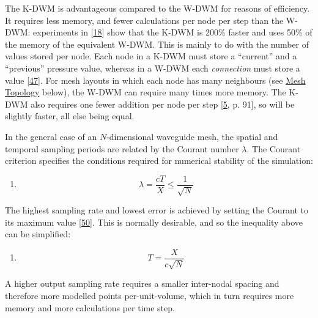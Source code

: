 \documentclass[]{scrreprt}
\providecommand{\tightlist}{%
  \setlength{\itemsep}{0pt}\setlength{\parskip}{0pt}}
\begin{document}
The K-DWM is advantageous compared to the W-DWM for reasons of
efficiency. It requires less memory, and fewer calculations per node per
step than the W-DWM: experiments in
{[}\protect\hyperlink{ref-beesonux5froomweaver:ux5f2004}{18}{]} show
that the K-DWM is 200\% faster and uses 50\% of the memory of the
equivalent W-DWM. This is mainly to do with the number of values stored
per node. Each node in a K-DWM must store a ``current'' and a
``previous'' pressure value, whereas in a W-DWM each \emph{connection}
must store a value
{[}\protect\hyperlink{ref-karjalainenux5fdigitalux5f2004}{47}{]}. For
mesh layouts in which each node has many neighbours (see
\protect\hyperlink{mesh-topology}{Mesh Topology} below), the W-DWM can
require many times more memory. The K-DWM also requires one fewer
addition per node per step
{[}\protect\hyperlink{ref-shelleyux5fdiffuseux5f2007}{5}, p. 91{]}, so
will be slightly faster, all else being equal.

In the general case of an \(N\)-dimensional waveguide mesh, the spatial
and temporal sampling periods are related by the Courant number
\(\lambda\). The Courant criterion specifies the conditions required for
numerical stability of the simulation:

\begin{enumerate}
\def\labelenumi{(\arabic{enumi})}
\setcounter{enumi}{21}
\tightlist
\item
  \[\lambda=\frac{cT}{X} \leq \frac{1}{\sqrt{N}}\]
\end{enumerate}

The highest sampling rate and lowest error is achieved by setting the
Courant to its maximum value
{[}\protect\hyperlink{ref-sheafferux5ffdtdux2fk-dwmux5f2010}{50}{]}.
This is normally desirable, and so the inequality above can be
simplified:

\begin{enumerate}
\def\labelenumi{(\arabic{enumi})}
\setcounter{enumi}{22}
\tightlist
\item
  \[T=\frac{X}{c\sqrt{N}}\]
\end{enumerate}

A higher output sampling rate requires a smaller inter-nodal spacing and
therefore more modelled points per-unit-volume, which in turn requires
more memory and more calculations per time step.
\end{document}
